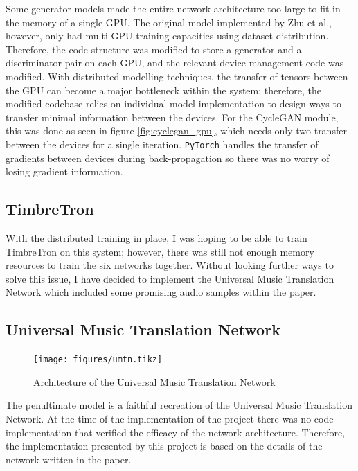 \documentclass[]{report}
\begin{document}
Some generator models made the entire network architecture too large to
fit in the memory of a single GPU. The original model implemented by Zhu
et al., however, only had multi-GPU training capacities using dataset
distribution. Therefore, the code structure was modified to store a
generator and a discriminator pair on each GPU, and the relevant device
management code was modified. With distributed modelling techniques, the
transfer of tensors between the GPU can become a major bottleneck within
the system; therefore, the modified codebase relies on individual model
implementation to design ways to transfer minimal information between
the devices. For the CycleGAN module, this was done as seen in figure
\ref{fig:cyclegan_gpu}, which needs only two transfer between the
devices for a single iteration. \texttt{PyTorch} handles the transfer of
gradients between devices during back-propagation so there was no worry
of losing gradient information.

\hypertarget{timbretron-1}{%
\subsection{TimbreTron}\label{timbretron-1}}

With the distributed training in place, I was hoping to be able to train
TimbreTron on this system; however, there was still not enough memory
resources to train the six networks together. Without looking further
ways to solve this issue, I have decided to implement the Universal
Music Translation Network which included some promising audio samples
within the paper.

\hypertarget{universal-music-translation-network-1}{%
\subsection{Universal Music Translation
Network}\label{universal-music-translation-network-1}}

\begin{figure}[h]
    \texttt{[image: figures/umtn.tikz]}
\centering 
\caption{Architecture of the Universal Music Translation Network \label{fig:umtn}}
\end{figure}

The penultimate model is a faithful recreation of the Universal Music
Translation Network. At the time of the implementation of the project
there was no code implementation that verified the efficacy of the
network architecture. Therefore, the implementation presented by this
project is based on the details of the network written in the paper.
\end{document}
